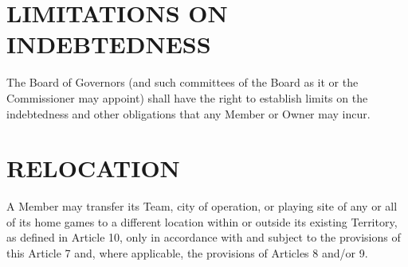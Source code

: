 \documentclass[]{book}
\begin{document}
\hypertarget{limitations-on-indebtedness}{%
\section{LIMITATIONS ON INDEBTEDNESS}\label{limitations-on-indebtedness}}

The Board of Governors (and such committees of the Board as it or the Commissioner may appoint) shall have the right to establish limits on the indebtedness and other obligations that any Member or Owner may incur.

\hypertarget{relocation}{%
\section{RELOCATION}\label{relocation}}

A Member may transfer its Team, city of operation, or playing site of any or all of its home games to a different location within or outside its existing Territory, as defined in Article 10, only in accordance with and subject to the provisions of this Article 7 and, where applicable, the provisions of Articles 8 and/or 9.
\end{document}
